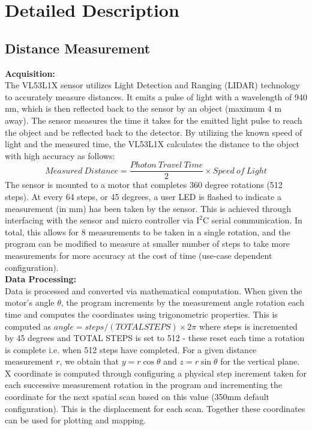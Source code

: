 \documentclass[12pt, letterpaper]{article}
\begin{document}
\section{Detailed Description}
\subsection{Distance Measurement}\label{Distance Measurement}
\textbf{Acquisition:}\\
The VL53L1X sensor utilizes Light Detection and Ranging (LIDAR) technology to accurately measure distances. It emits a pulse of light with a wavelength of 940 nm, which is then reflected back to the sensor by an object (maximum 4 m away). The sensor measures the time it takes for the emitted light pulse to reach the object and be reflected back to the detector. By utilizing the known speed of light and the measured time, the VL53L1X calculates the distance to the object with high accuracy as follows:
$$Measured\ Distance = \frac{Photon\ Travel\ Time}{2}\times Speed\ of\ Light$$ The sensor is mounted to a motor that completes 360 degree rotations (512 steps). At every 64 steps, or 45 degrees, a user LED is flashed to indicate a measurement (in mm) has been taken by the sensor. This is achieved through interfacing with the sensor and micro controller via $\mathrm{I^2C}$ serial communication. In total, this allows for 8 measurements to be taken in a single rotation, and the program can be modified to measure at smaller number of steps to take more measurements for more accuracy at the cost of time (use-case dependent configuration). \\ 
\textbf{Data Processing:} \\
Data is processed and converted via mathematical computation. When given the motor's angle $\theta$, the program increments by the measurement angle rotation each time and computes the coordinates using trigonometric properties. This is computed as $angle = steps/(TOTAL STEPS) \times 2\pi$ where steps is incremented by 45 degrees and TOTAL STEPS is set to 512 - these reset each time a rotation is complete i.e. when 512 steps have completed. For a given distance measurement $r$, we obtain that $y = r\cos{\theta}$ and $z = r\sin{\theta}$ for the vertical plane. X coordinate is computed through configuring a physical step increment taken for each successive measurement rotation in the program and incrementing the coordinate for the next spatial scan based on this value (350mm default configuration). This is the displacement for each scan. Together these coordinates can be used for plotting and mapping. \\
\end{document}
